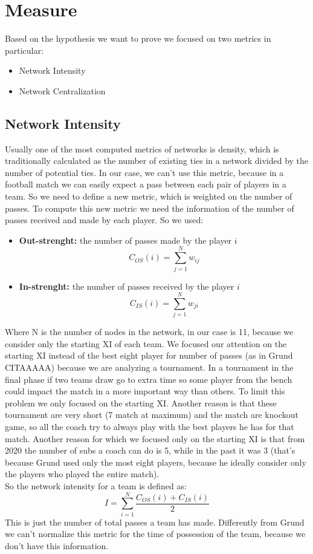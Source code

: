 \documentclass[12pt, a4paper]{article}
\begin{document}
\section{Measure}
\label{measures}
Based on the hypothesis we want to prove we focused on two metrics in particular:
\begin{itemize}
        \item Network Intensity
        \item Network Centralization
\end{itemize}
\subsection{Network Intensity}
Usually one of the most computed metrics of networks is density, which
is traditionally calculated as the number of existing ties in a network divided by the number of potential ties. In our case, we can't use this metric, because in a football match we can easily expect a pass between each pair of players in a team. So we need to define a new metric, which is weighted on the number of passes. To compute this new metric we need the information of the number of passes received and made by each player. So we used: 
\begin{itemize}
        \item \textbf{Out-strenght:} the number of passes made by the player $i$
        $$ C_{OS}(i) = \sum^{N}_{j=1}w_{ij}$$
        \item \textbf{In-strenght:} the number of passes received by the player $i$
         $$C_{IS}(i) = \sum^{N}_{j=1}w_{ji}$$
\end{itemize}
Where N is the number of nodes in the network, in our case is 11, because we consider only the starting XI of each team. We focused our attention on the starting XI instead of the best eight player for number of passes (as in Grund CITAAAAA) because we are analyzing a tournament. In a tournament in the final phase if two teams draw go to extra time so some player from the bench could impact the match in a more important way than others. To limit this problem we only focused on the starting XI. Another reason is that these tournament are very short (7 match at maximum) and the match are knockout game, so all the coach try to always play with the best players he has for that match. Another reason for which we focused only on the starting XI is that from 2020 the number of subs a coach can do is 5, while in the past it was 3 (that's because Grund used only the most eight players, because he ideally consider only the players who played the entire match). \\
So the network intensity for a team is defined as:
$$I = \sum^N_{i=1} \frac{ C_{OS}(i) +  C_{IS}(i)}{2}$$
This is just the number of total passes a team has made. Differently from Grund we can't normalize this metric for the time of possession of the team, because we don't have this information. \\
\end{document}
